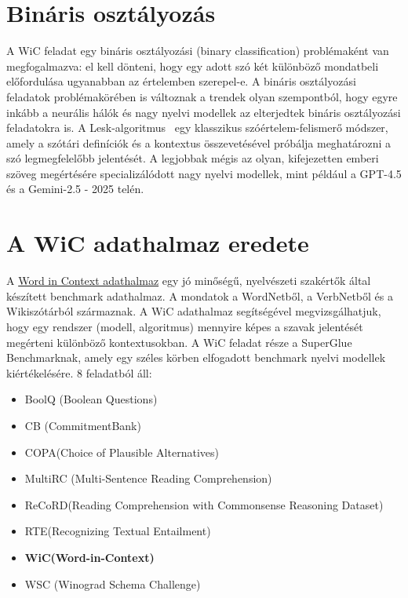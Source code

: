 \documentclass[12pt]{report}
\theoremstyle{definition}
\begin{document}
\section{Bináris osztályozás}
A WiC feladat egy bináris osztályozási (binary classification) problémaként van megfogalmazva: el kell dönteni, hogy egy adott szó két különböző mondatbeli előfordulása ugyanabban az értelemben szerepel-e.
A bináris osztályozási feladatok problémakörében is változnak a trendek olyan szempontból, hogy egyre inkább a neurális hálók és nagy nyelvi modellek az elterjedtek bináris osztályozási feladatokra is. A Lesk-algoritmus~\cite{lesk1986automatic} egy klasszikus szóértelem-felismerő módszer, amely a szótári definíciók és a kontextus összevetésével próbálja meghatározni a szó legmegfelelőbb jelentését. A legjobbak mégis az olyan, kifejezetten emberi szöveg megértésére specializálódott nagy nyelvi modellek, mint például a GPT-4.5 és a Gemini-2.5 - 2025 telén.

\label{wic:dataset}
\section{A WiC adathalmaz eredete}

A \href{https://pilehvar.github.io/wic/}{Word in Context adathalmaz} egy jó minőségű, nyelvészeti szakértők által készített benchmark adathalmaz. A mondatok a WordNetből, a VerbNetből és a Wikiszótárból származnak.
A WiC adathalmaz segítségével megvizsgálhatjuk, hogy egy rendszer (modell, algoritmus) mennyire képes a szavak jelentését megérteni különböző kontextusokban. A WiC feladat része a SuperGlue~\cite{sarlin2020superglue} Benchmarknak, amely egy széles körben elfogadott benchmark nyelvi modellek kiértékelésére. 8 feladatból áll:
\begin{itemize}
	\item  BoolQ (Boolean Questions)
	\item  CB (CommitmentBank)
	\item COPA(Choice of Plausible Alternatives)
	\item MultiRC (Multi-Sentence Reading Comprehension)
	\item ReCoRD(Reading Comprehension with Commonsense Reasoning Dataset)
	\item RTE(Recognizing Textual Entailment)
	\item \textbf{WiC(Word-in-Context)}
	\item  WSC (Winograd Schema Challenge)
\end{itemize}
\end{document}

